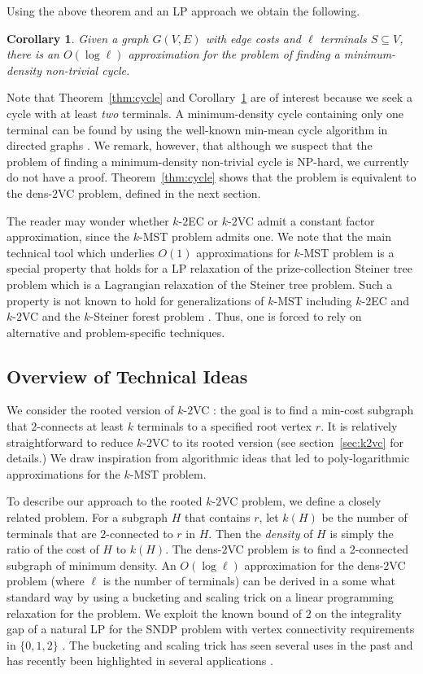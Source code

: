 \documentclass[11pt]{article}
\newtheorem{corollary}[lemma]{Corollary}
\newcommand{\kec}[1]{$k$-$#1${\sc EC} }
\newcommand{\kvc}[1]{$k$-$#1${\sc VC} }
\newcommand{\ke}{\kec{2}}
\newcommand{\kv}{\kvc{2}}
\newcommand{\densV}{dens-$2${\sc VC} }
\begin{document}
Using the above theorem and an LP approach we obtain the following. 
\begin{corollary}
  \label{cor:cycle}
  Given a graph $G(V,E)$ with edge costs and $\ell$ terminals
  $S\subseteq V$, there is an $O(\log \ell)$ approximation for the
  problem of finding a minimum-density non-trivial cycle.
\end{corollary}

Note that Theorem~\ref{thm:cycle} and Corollary~\ref{cor:cycle} are of
interest because we seek a cycle with at least {\em two} terminals.  A
minimum-density cycle containing only one terminal can be found by
using the well-known min-mean cycle algorithm in directed graphs
\cite{networkflows_book}.  We remark, however, that although we
suspect that the problem of finding a minimum-density non-trivial
cycle is NP-hard, we currently do not have a proof.
Theorem~\ref{thm:cycle} shows that the problem is equivalent to the
\densV problem, defined in the next section.

\smallskip
{} The reader may wonder whether \ke or \kv admit
a constant factor approximation, since the $k$-MST problem admits one.
We note that the main technical tool which underlies $O(1)$
approximations for $k$-MST problem \cite{BlumRV96,Garg96,ChudakRW} is
a special property that holds for a LP relaxation of the
prize-collection Steiner tree problem \cite{GoemansW96} which is a
Lagrangian relaxation of the Steiner tree problem. Such a property is
not known to hold for generalizations of $k$-MST including \ke and \kv
and the $k$-Steiner forest problem \cite{HajiaghayiJ}. Thus, one is
forced to rely on alternative and problem-specific techniques.


\subsection{Overview of Technical Ideas}
We consider the rooted version of \kv: the goal is to find a min-cost
subgraph that $2$-connects at least $k$ terminals to a specified root
vertex $r$. It is relatively straightforward to reduce \kv to its
rooted version (see section~\ref{sec:k2vc} for details.)  We draw
inspiration from algorithmic ideas that led to poly-logarithmic
approximations for the $k$-MST problem. 

To describe our approach to the rooted \kv problem, we define a
closely related problem. For a subgraph $H$ that contains $r$, let
$k(H)$ be the number of terminals that are $2$-connected to $r$ in
$H$. Then the {\em density} of $H$ is simply the ratio of the cost of
$H$ to $k(H)$. The \densV problem is to find a 2-connected subgraph of
minimum density. An $O(\log \ell)$ approximation for the \densV
problem (where $\ell$ is the number of terminals) can be derived in a
some what standard way by using a bucketing and scaling trick on a
linear programming relaxation for the problem. We exploit the known
bound of $2$ on the integrality gap of a natural LP for the SNDP
problem with vertex connectivity requirements in $\{0,1,2\}$
\cite{FleischerJW}.  The bucketing and scaling trick has seen several
uses in the past and has recently been highlighted in several
applications \cite{ChekuriHKS06,ChekuriHKS07,ChekuriEGS08}.
\end{document}
